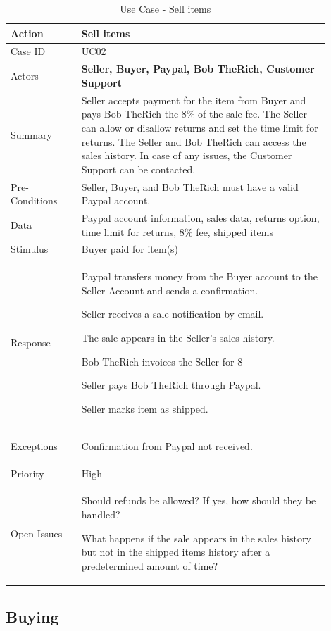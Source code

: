 \documentclass[11pt]{article}
\newcounter{use case ID}
\newcommand\tabularhead[1]{
    \begin{table}[ht]
        \addtocounter{use case ID}{1}
        \caption{Use Case \arabic{use case ID} - #1}
        \vspace{0.2cm}
        \begin{tabular}{|p{0.2\linewidth}|p{0.70\linewidth}|}
            \hline
            \textbf{Action} & \textbf{#1} \\
            \hline}
\newcommand\addrow[2]{#1 & #2\\ \hline}
\newcommand\addmulrow[2]{ \begin{minipage}[t][][t]{2.5cm}#1\end{minipage}
                &\begin{minipage}[t][][t]{11cm}
                    \begin{enumerate}[itemsep=-1ex] #2   \end{enumerate}
                \end{minipage}\vfill\\ \hline}
\newenvironment{usecase}{\tabularhead}
        {\hline\end{tabular}\end{table}}
\begin{document}
\begin{usecase}{Sell items}
    \addrow{Case ID}{UC02}
    \addrow{Actors}{\textbf{Seller, Buyer, Paypal, Bob TheRich, Customer Support}}
    \addrow{Summary}{Seller accepts payment for the item from Buyer and pays Bob TheRich the 8\% of the sale fee. The Seller can allow or disallow returns and set the time limit for returns. The Seller and Bob TheRich can access the sales history. In case of any issues, the Customer Support can be contacted.}
    \addrow{Pre-Conditions}{Seller, Buyer, and Bob TheRich must have a valid Paypal account. }
    \addrow{Data}{Paypal account information, sales data, returns option, time limit for returns, 8\% fee, shipped items}
    \addrow{Stimulus}{Buyer paid for item(s)}
    \addmulrow{Response}{
        \begin{itemize}{
            \item Paypal transfers money from the Buyer account to the Seller Account and sends a confirmation.
            \item Seller receives a sale notification by email.
            \item The sale appears in the Seller’s sales history.
            \item Bob TheRich invoices the Seller for 8%
            \item Seller pays Bob TheRich through Paypal. 
            \item Seller marks item as shipped. }
        \end {itemize}}
    \addmulrow{Exceptions}{
        \begin{enumerate}{
            \item Confirmation from Paypal not received.
            } 
        \end{enumerate}}
    \addrow{Priority}{High}
    \addmulrow{Open Issues}{
        \begin{enumerate}{
                \item Should refunds be allowed? If yes, how should they be handled?
                \item What happens if the sale appears in the sales history but not in the shipped items history after a predetermined amount of time?
                } 
            \end{enumerate}}
\end{usecase}
\clearpage

\subsection{Buying}
\end{document}
